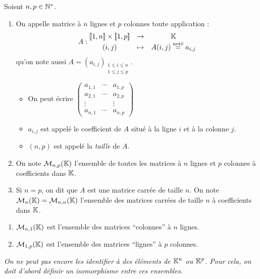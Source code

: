 \documentclass[12pt, a4paper]{report}
\begin{document}
\begin{definition}[Matrice]
    Soient $n,p \in \mathbb{N}^*$.
    \begin{enumerate}
        \item On appelle matrice à $n$ lignes et $p$ colonnes toute application :
        $$A : \begin{matrix}
        [\![1,n]\!] \times [\![1,p]\!] &\to &\mathbb{K}
        \\ (i,j) &\mapsto &A(i,j) \overset{\text{noté}}= a_{i,j}
        \end{matrix}$$
        qu'on note aussi $A = (a_{i,j})_{\substack{1 \leq i \leq n\\ 1\leq j \leq p}}$.
        \begin{itemize}
            \item On peut écrire $\left(\begin{matrix}
            a_{1,1} & \cdots & a_{1,p}
            \\
            a_{2,1} & \cdots & a_{2,p}
            \\
            \vdots & & \vdots
            \\
            a_{n,1} & \cdots & a_{n,p}
            \end{matrix}\right)$
            \item $a_{i,j}$ est appelé le coefficient de $A$ situé à la ligne $i$ et à la colonne $j$.
            \item $(n,p)$ est appelé la \textit{taille} de $A$.
        \end{itemize}
        \item On note $\mathcal M_{n,p}(\mathbb{K})$ l'ensemble de toutes les matrices à $n$ lignes et $p$ colonnes à coefficients dans $\mathbb{K}$.
        \item Si $n=p$, on dit que $A$ est une matrice carrée de taille $n$. On note $\mathcal M_n(\mathbb{K}) = \mathcal M_{n,n}(\mathbb{K})$ l'ensemble des matrices carrées de taille $n$ à coefficients dans $\mathbb{K}$.
    \end{enumerate}
\end{definition}

\begin{remark}
    \begin{enumerate}
        \item $\mathcal M_{n,1}(\mathbb{K})$ est l'ensemble des matrices ``colonnes'' à $n$ lignes.
        \item $\mathcal M_{1,p}(\mathbb{K})$ est l'ensemble des matrices ``lignes'' à $p$ colonnes.
    \end{enumerate}
    \textit{On ne peut pas encore les identifier à des éléments de $\mathbb{K}^n$ ou $\mathbb{K}^p$. Pour cela, on doit d'abord définir un isomorphisme entre ces ensembles.}
\end{remark}
\end{document}
